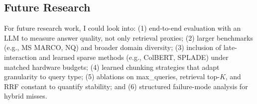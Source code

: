 \documentclass[twoside, 11pt]{article}
\begin{document}
\subsection{Future Research}
For future research work, I could look into: (1) end-to-end evaluation with an LLM to measure answer quality, not only retrieval proxies; (2) larger benchmarks (e.g., MS MARCO, NQ) and broader domain diversity; (3) inclusion of late-interaction and learned sparse methods (e.g., ColBERT, SPLADE) under matched hardware budgets; (4) learned chunking strategies that adapt granularity to query type; (5) ablations on max\_queries, retrieval top-$K$, and RRF constant to quantify stability; and (6) structured failure-mode analysis for hybrid misses.



\end{document}
